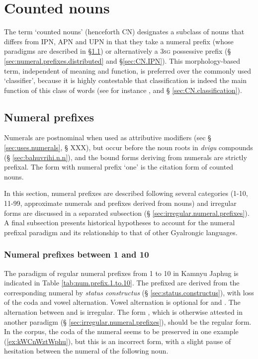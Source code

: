 \section{Counted nouns} \label{sec:counted.nouns}

The term `counted nouns' (henceforth CN) designates a subclass of nouns that differs from IPN, APN and UPN in that they take a numeral prefix (whose paradigms are described in §\ref{sec:numeral.prefixes}) or alternatively a \textsc{3sg} possessive prefix (§ \ref{sec:numeral.prefixes.distributed} and §\ref{sec:CN.IPN}). This morphology-based term, independent of meaning and function, is preferred over the commonly used  `classifier', because it is highly contestable that classification is indeed the main function of this class of words (see for instance \citealt{francois99classificateurs}, and § \ref{sec:CN.classification}).

\subsection{Numeral prefixes} \label{sec:numeral.prefixes}
Numerals are postnominal when used as attributive modifiers (sec § \ref{sec:uses.numerals}, § XXX), but occur before the noun roots in \textit{dvigu} compounds (§ \ref{sec:bahuvrihi.n.n}), and the bound forms deriving from numerals are strictly prefixal. The form with numeral prefix `one' is the citation form of counted nouns.

In this section, numeral prefixes are described following several categories (1-10, 11-99, approximate numerals and prefixes derived from nouns) and irregular forms are discussed in a separated subsection (§ \ref{sec:irregular.numeral.prefixes}). A final subsection presents historical hypotheses to account for the numeral prefixal paradigm and its relationship to that of other Gyalrongic languages.

\subsubsection{Numeral prefixes between 1 and 10} \label{sec:num.prefixes.1.10}
The paradigm of regular numeral prefixes from 1 to 10 in Kamnyu Japhug is indicated in Table \ref{tab:num.prefix.1.to.10}. The prefixed are derived from the corresponding numeral by \textit{status constructus} (§ \ref{sec:status.constructus}), with loss of the coda and vowel alternation. Vowel alternation is optional for  and  . The alternation between  and  is irregular. The form , which is otherwise attested in another  paradigm (§ \ref{sec:irregular.numeral.prefixes}), should be the regular form. In the corpus,  the coda  of the numeral  seems to be preserved in one example (\ref{ex:kWCnWztWphu}), but this is an incorrect form, with a slight pause of hesitation between the numeral of the following noun.

